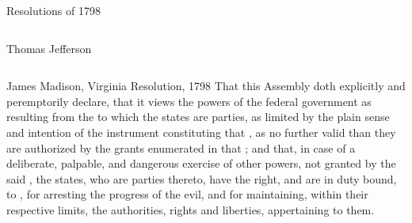 \begin{frame}{Resolutions of 1798}
\begin{columns}[c]
            { \tiny Thomas Jefferson \\ }
    \end{columns}
\end{frame}

\begin{frame}{James Madison, Virginia Resolution, 1798}
    That this Assembly doth explicitly and peremptorily declare, that it views
    the powers of the federal government as resulting from the
    \textbf{\colorbox{goodblue}{\color{white}{compact}}}
    to which the states are parties, as limited by
    the plain sense and intention of the instrument constituting that
    \textbf{\colorbox{goodblue}{\color{white}{compact}}},
    as no further valid than they are
    authorized by the grants enumerated in that
    \textbf{\colorbox{goodblue}{\color{white}{compact}}};
    and that, in case of a deliberate, palpable, and dangerous
    exercise of other powers, not granted by the said
    \textbf{\colorbox{goodblue}{\color{white}{compact}}},
    the states, who are parties thereto, have the right, and are
    in duty bound, to
    \textbf{\colorbox{goodred}{\color{white}{interpose}}},
    for arresting the
    progress of the evil, and for maintaining, within their respective
    limits, the authorities, rights and liberties, appertaining to them.  
\end{frame}

